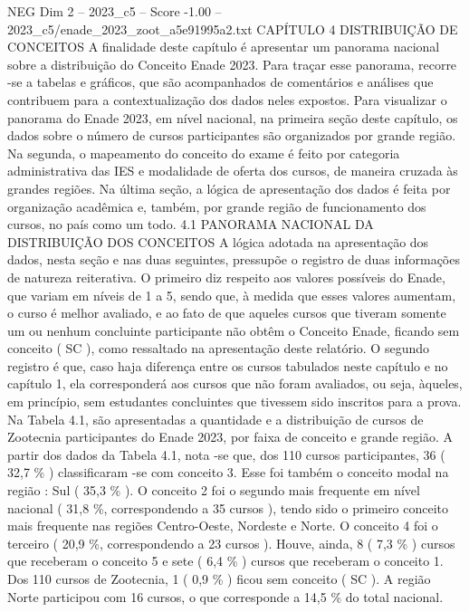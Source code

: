 \begin{textsample}{NEG Dim 2 – 2023\_c5 – Score -1.00 – 2023\_c5/enade\_2023\_zoot\_a5e91995a2.txt}  \label{ex:f2_neg_171}
CAPÍTULO 4 DISTRIBUIÇÃO DE CONCEITOS A finalidade deste capítulo é apresentar um panorama nacional sobre a distribuição do Conceito Enade 2023.
Para traçar esse panorama, recorre -se a tabelas e gráficos, que são acompanhados de comentários e análises que contribuem para a contextualização dos dados neles expostos.
Para visualizar o panorama do Enade 2023, em nível nacional, na primeira seção deste capítulo, os dados sobre o número de cursos participantes são organizados por grande região.
Na segunda, o mapeamento do conceito do exame é feito por categoria administrativa das IES e modalidade de oferta dos cursos, de maneira cruzada às grandes regiões.
Na última seção, a lógica de apresentação dos dados é feita por organização acadêmica e, também, por grande região de funcionamento dos cursos, no país como um todo. 4.1 PANORAMA NACIONAL DA DISTRIBUIÇÃO DOS CONCEITOS A lógica adotada na apresentação dos dados, nesta seção e nas duas seguintes, pressupõe o registro de duas informações de natureza reiterativa.
O primeiro diz respeito aos valores possíveis do Enade, que variam em níveis de 1 a 5, sendo que, à medida que esses valores aumentam, o curso é melhor avaliado, e ao fato de que aqueles cursos que tiveram somente um ou nenhum concluinte participante não obtêm o Conceito Enade, ficando sem conceito ( SC ), como ressaltado na apresentação deste relatório.
O segundo registro é que, caso haja diferença entre os cursos tabulados neste capítulo e no capítulo 1, ela corresponderá aos cursos que não foram avaliados, ou seja, àqueles, em princípio, sem estudantes concluintes que tivessem sido inscritos para a prova.
Na Tabela 4.1, são apresentadas a quantidade e a distribuição de cursos de Zootecnia participantes do Enade 2023, por faixa de conceito e grande região.
A partir dos dados da Tabela 4.1, nota -se que, dos 110 cursos participantes, 36 ( 32,7 \% ) classificaram -se com conceito 3.
Esse foi também o conceito modal na região : Sul ( 35,3 \% ).
O conceito 2 foi o segundo mais frequente em nível nacional ( 31,8 \%, correspondendo a 35 cursos ), tendo sido o primeiro conceito mais frequente nas regiões Centro-Oeste, Nordeste e Norte.
O conceito 4 foi o terceiro ( 20,9 \%, correspondendo a 23 cursos ).
Houve, ainda, 8 ( 7,3 \% ) cursos que receberam o conceito 5 e sete ( 6,4 \% ) cursos que receberam o conceito 1.
Dos 110 cursos de Zootecnia, 1 ( 0,9 \% ) ficou sem conceito ( SC ).
A região Norte participou com 16 cursos, o que corresponde a 14,5 \% do total nacional.

\end{textsample}
